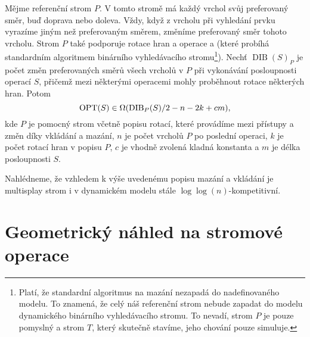 \begin{veta}
\def\dib{\operatorname{DIB}}
Mějme referenční strom $P$. V tomto stromě má každý vrchol svůj preferovaný
směr, buď doprava nebo doleva. Vždy, když z vrcholu při vyhledání prvku vyrazíme
jiným než preferovaným směrem, změníme preferovaný směr tohoto vrcholu. Strom
$P$ také podporuje rotace hran a operace  a  (které
probíhá standardním algoritmem binárního vyhledávacího stromu\footnote{Platí,
že standardní algoritmus na mazání nezapadá do nadefinovaného modelu. To
znamená, že celý náš referenční strom nebude zapadat do modelu dynamického
binárního vyhledávacího stromu. To nevadí, strom $P$ je pouze pomyslný a strom
$T$, který skutečně stavíme, jeho chování pouze simuluje.}). Nechť $\dib(S)_P$ je
počet změn preferovaných směrů všech vrcholů v $P$ při vykonávání posloupnosti
operací $S$, přičemž mezi některými operacemi mohly proběhnout rotace některých
hran. Potom $$\opt(S) \in \Omega(\dib_P(S)/2 - n - 2k + cm),$$ kde $P$ je pomocný strom včetně popisu rotací, které provádíme mezi přístupy a změn díky vkládání a mazání, $n$ je počet vrcholů $P$ po poslední operaci, $k$ je počet rotací hran v popisu $P$, $c$ je vhodně zvolená kladná konstanta a $m$ je délka posloupnosti $S$. 
\end{veta}

Nahlédneme, že vzhledem k výše uvedenému popisu mazání a vkládání je multisplay strom i v dynamickém modelu stále $\log\log(n)$-kompetitivní. 

\section{Geometrický náhled na stromové operace}
